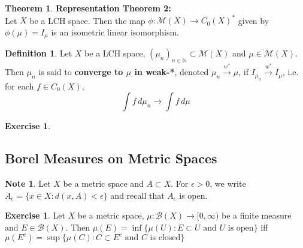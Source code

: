 \documentclass[12pt]{amsart}
\theoremstyle{definition}
\newtheorem{defn}[definition]{Definition}
\newtheorem{note}[definition]{Note}
\newtheorem{thm}[definition]{Theorem}
\newtheorem{ex}[definition]{Exercise}
\newcommand{\ep}{\epsilon}
\newcommand{\N}{\mathbb{N}}
\newcommand{\MB}{\mathcal{B}}
\newcommand{\MM}{\mathcal{M}}
\newcommand{\dmu}{\, d \mu}
\newcommand{\Rg}{[0,\infty)}
\newcommand{\conv}[1]{\xrightarrow{#1}}
\newcommand{\lex}[1]{\label{ex:#1}}
\newcommand{\ld}[1]{\label{defn:#1}}
\begin{document}
	\begin{thm}\textbf{Representation Theorem 2:}\\
	Let $X$ be a LCH space. Then the map $\phi: \MM(X) \rightarrow C_0(X)^*$ given by $\phi(\mu) = I_{\mu}$ is an isometric linear isomorphism. 
	\end{thm}
	
	
	
	
	\begin{defn} \ld{00000} 
	Let $X$ be a LCH space, $(\mu_n)_{n \in \N} \subset \MM(X)$ and $\mu \in \MM(X)$. Then $\mu_n$ is said to  \textbf{converge to $\mu$ in weak-*}, denoted $\mu_n \conv{w^*}\mu$, if $I_{\mu_n} \conv{w^*} I_{\mu}$, i.e. for each $f \in C_0(X)$, $$\int f \dmu_n \rightarrow \int f \dmu$$
	\end{defn}
	
	\begin{ex} \lex{00000} 
	
	\end{ex}
	
	
	
	
	
	
	
	
	
	

	
	
	
	
	
	
	
	
	
	
	
	
	\newpage
	\subsection{Borel Measures on Metric Spaces}
	\begin{note}
		Let $X$ be a metric space and $A \subset X$. For $\ep >0$, we write $A_{\ep} = \{x \in X: d(x, A) < \ep\}$ and recall that $A_{\ep}$ is open.
	\end{note}

	\begin{ex}
		Let $X$ be a metric space, $\mu: \MB(X) \rightarrow \Rg$ be a finite measure and $E \in \MB(X)$. Then 
		$\mu(E) = \inf  \{\mu(U): E \subset U \text{ and $U$ is open} \}$ iff $\mu(E^c) = \sup  \{\mu(C): C \subset E^c \text{ and $C$ is closed} \}$ 
	\end{ex}
\end{document}
